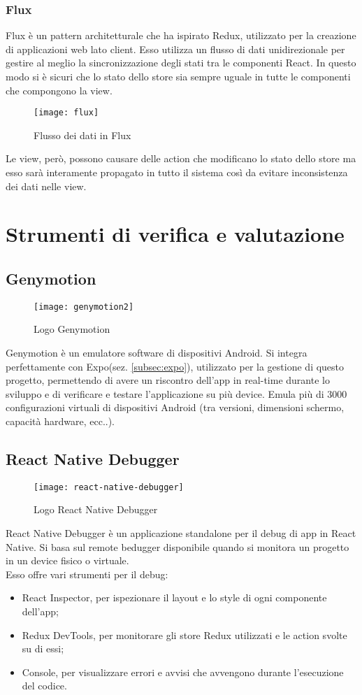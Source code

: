 \subsubsection{Flux}
 Flux è un pattern architetturale che ha ispirato Redux, utilizzato per la creazione di applicazioni web lato client. Esso utilizza un flusso di dati unidirezionale per gestire al meglio la sincronizzazione degli stati tra le componenti React. In questo modo si è sicuri che lo stato dello store sia sempre uguale in tutte le componenti che compongono la view.
 \begin{figure}[H] 
 	\centering
 	\texttt{[image: flux]}
 	\caption{Flusso dei dati in Flux}
 \end{figure}
 Le view, però, possono causare delle action che modificano lo stato dello store ma esso sarà interamente propagato in tutto il sistema così da evitare inconsistenza dei dati nelle view.
 
\section{Strumenti di verifica e valutazione}

\subsection{Genymotion}
\begin{figure}[H] 
	\centering
	\texttt{[image: genymotion2]}
	\caption{Logo Genymotion}
\end{figure}
Genymotion è un emulatore software di dispositivi Android. Si integra perfettamente con Expo(sez. \ref{subsec:expo}), utilizzato per la gestione di questo progetto, permettendo di avere un riscontro dell'app in real-time durante lo sviluppo e di verificare e testare l'applicazione su più device. Emula più di 3000 configurazioni virtuali di dispositivi Android (tra versioni, dimensioni schermo, capacità hardware, ecc..). 

\subsection{React Native Debugger}
\begin{figure}[H] 
	\centering
	\texttt{[image: react-native-debugger]}
	\caption{Logo React Native Debugger}
\end{figure}
React Native Debugger è un applicazione standalone per il debug di app in React Native. Si basa sul remote bedugger disponibile quando si monitora un progetto in un device fisico o virtuale.\\ Esso offre vari strumenti per il debug:
\begin{itemize}
	\item React Inspector, per ispezionare il layout e lo style di ogni componente dell'app;
	\item Redux DevTools, per monitorare gli store Redux utilizzati e le action svolte su di essi;
	\item Console, per visualizzare errori e avvisi che avvengono durante l'esecuzione del codice.
\end{itemize}

